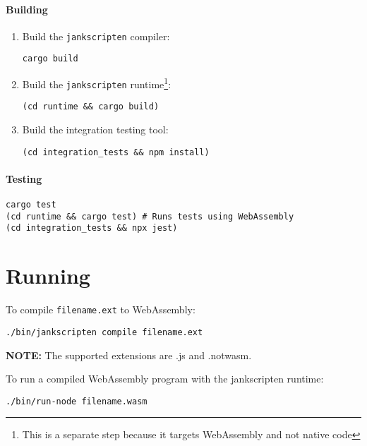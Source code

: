 \documentclass{article}
\newcommand{\system}{\texttt{jankscripten}\xspace}
\begin{document}
\paragraph{Building}

\begin{enumerate}

\item Build the \system compiler:
\begin{verbatim}
cargo build
\end{verbatim}

\item Build the \system runtime\footnote{This is a separate step because it
targets WebAssembly and not native code}:
\begin{verbatim}
(cd runtime && cargo build)
\end{verbatim}

\item Build the integration testing tool:
\begin{verbatim}
(cd integration_tests && npm install)
\end{verbatim}

\end{enumerate}

\paragraph{Testing}

\begin{verbatim}
cargo test
(cd runtime && cargo test) # Runs tests using WebAssembly
(cd integration_tests && npx jest)
\end{verbatim}

\section{Running}
    
To compile \texttt{filename.ext} to WebAssembly:

\begin{verbatim}
./bin/jankscripten compile filename.ext
\end{verbatim}

\textbf{NOTE:} The supported extensions are .js and .notwasm.

To run a compiled WebAssembly program with the jankscripten runtime:

\begin{verbatim}
./bin/run-node filename.wasm
\end{verbatim}
\end{document}
